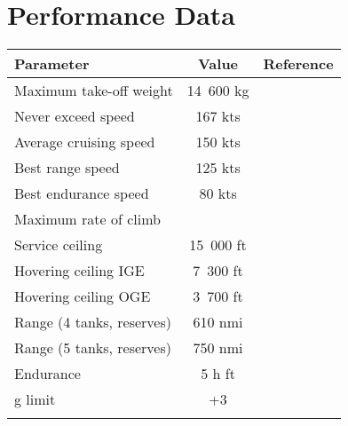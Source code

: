 \section{Performance Data}

\begin{tabularx}{\textwidth}{ | L | c | c | }
  \hline
  \textbf{Parameter}        & \textbf{Value} & \textbf{Reference} \\ \hline
  Maximum take-off weight   & 14~600 kg      & \cite{Janes20042005} \\ \hline
  Never exceed speed        & 167 kts        & \cite{Janes20042005} \\ \hline
  Average cruising speed    & 150 kts        & \cite{Janes20042005} \\ \hline
  Best range speed          & 125 kts        & \cite{Janes20042005} \\ \hline
  Best endurance speed      & 80 kts         & \cite{Janes20042005} \\ \hline
  Maximum rate of climb     &                & \\ \hline
  Service ceiling           & 15~000 ft      & \cite{Janes20042005} \\ \hline
  Hovering ceiling IGE      & 7~300 ft       & \cite{Janes20042005} \\ \hline
  Hovering ceiling OGE      & 3~700 ft       & \cite{Janes20042005} \\ \hline
  Range (4 tanks, reserves) & 610 nmi        & \cite{Janes20042005} \\ \hline
  Range (5 tanks, reserves) & 750 nmi        & \cite{Janes20042005} \\ \hline
  Endurance                 & 5 h ft         & \cite{Janes20042005} \\ \hline
  g limit                   & +3             & \cite{Janes20042005} \\ \hline
  \caption{Performance data}
\end{tabularx}
